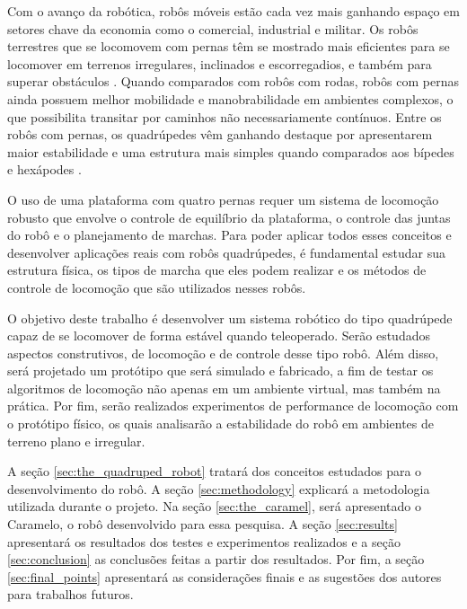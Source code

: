 \documentclass[../main.tex]{subfiles}
\begin{document}
Com o avanço da robótica, robôs móveis estão cada vez mais ganhando espaço em setores chave da economia como o comercial, industrial e militar. Os robôs terrestres que se locomovem com pernas têm se mostrado mais eficientes para se locomover em terrenos irregulares, inclinados e escorregadios, e também para superar obstáculos \cite{X.134}. Quando comparados com robôs com rodas, robôs com pernas ainda possuem melhor mobilidade e manobrabilidade em ambientes complexos, o que possibilita transitar por caminhos não necessariamente contínuos. Entre os robôs com pernas, os quadrúpedes vêm ganhando destaque por apresentarem maior estabilidade e uma estrutura mais simples quando comparados aos bípedes e hexápodes \cite{Shi2021}.


O uso de uma plataforma com quatro pernas requer um sistema de locomoção robusto que envolve o controle de equilíbrio da plataforma, o controle das juntas do robô e o planejamento de marchas. Para poder aplicar todos esses conceitos e desenvolver aplicações reais com robôs quadrúpedes, é fundamental estudar sua estrutura física, os tipos de marcha que eles podem realizar e os métodos de controle de locomoção que são utilizados nesses robôs.

O objetivo deste trabalho é desenvolver um sistema robótico do tipo quadrúpede capaz de se locomover de forma estável quando teleoperado. Serão estudados aspectos construtivos, de locomoção e de controle desse tipo robô. Além disso, será projetado um protótipo que será simulado e fabricado, a fim de testar os algoritmos de locomoção não apenas em um ambiente virtual, mas também na prática. Por fim, serão realizados experimentos de performance de locomoção com o protótipo físico, os quais analisarão a estabilidade do robô em ambientes de terreno plano e irregular.

A seção \ref{sec:the_quadruped_robot} tratará dos conceitos estudados para o desenvolvimento do robô. A seção \ref{sec:methodology} explicará a metodologia utilizada durante o projeto. Na seção \ref{sec:the_caramel}, será apresentado o Caramelo, o robô desenvolvido para essa pesquisa. A seção \ref{sec:results} apresentará os resultados dos testes e experimentos realizados e a seção \ref{sec:conclusion} as conclusões feitas a partir dos resultados. Por fim, a seção \ref{sec:final_points} apresentará as considerações finais e as sugestões dos autores para trabalhos futuros.
\end{document}
